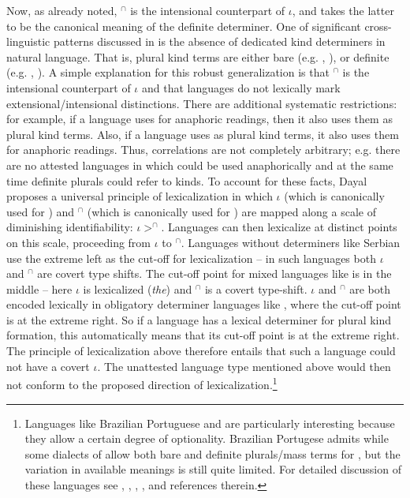 \documentclass[output=paper,
modfonts
]{langscibook}
\begin{document}
	Now, as already noted, $^\cap$ is the intensional counterpart of $\iota$, and \citet{Dayal2004} takes the latter to be the canonical meaning of the definite determiner. One of significant cross-linguistic patterns discussed in \citet{Dayal2004} is the absence of dedicated kind determiners in natural language. That is, plural kind terms are either bare (e.g. , ), or definite (e.g. , ). A simple explanation for this robust generalization is that $^\cap$ is the intensional counterpart of $\iota$ and that languages do not lexically mark extensional/intensional distinctions. There are additional systematic restrictions: for example, if a language uses  for anaphoric readings, then it also uses them as plural kind terms. Also, if a language uses  as plural kind terms, it also uses them for anaphoric readings. Thus, correlations are not completely arbitrary; e.g. there are no attested languages in which  could be used anaphorically and at the same time definite plurals could refer to kinds. To account for these facts, Dayal proposes a universal principle of lexicalization in which $\iota$ (which is canonically used for ) and $^\cap$ (which is canonically used for ) are mapped along a scale of diminishing identifiability: $\iota>^\cap$. Languages can then lexicalize at distinct points on this scale, proceeding from $\iota$ to $^\cap$. Languages without determiners like Serbian use the extreme left as the cut-off for lexicalization -- in such languages both $\iota$ and $^\cap$ are covert type shifts. The cut-off point for mixed languages like  is in the middle -- here $\iota$ is lexicalized (\textit{the}) and $^\cap$ is a covert type-shift. $\iota$ and $^\cap$ are both encoded lexically in obligatory determiner languages like , where the cut-off point is at the extreme right. So if a language has a lexical determiner for plural kind formation, this automatically means that its cut-off point is at the extreme right. The principle of lexicalization above therefore entails that such a language could not have a covert $\iota$. The unattested language type mentioned above would then not conform to the proposed direction of lexicalization.\footnote{Languages like Brazilian Portuguese and  are particularly interesting because they allow a certain degree of optionality. Brazilian Portugese admits  while some dialects of  allow both bare and definite plurals/mass terms for , but the variation in available meanings is still quite limited. For detailed discussion of these languages see \citet{Dayal2004,Dayal2011}, \citet{Krifka1995}, \citet{Muller2002}, \citet{MunnSchmitt2005}, \citet{Cyrino2015} and references therein.} 
	
\end{document}
